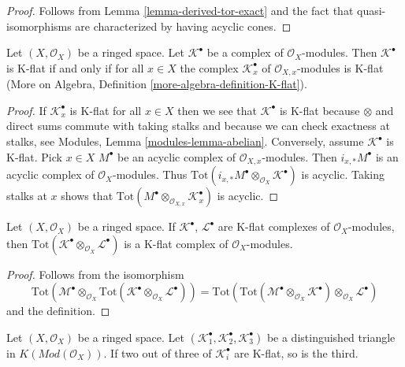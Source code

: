 \begin{proof}
Follows from
Lemma \ref{lemma-derived-tor-exact}
and the fact that quasi-isomorphisms are characterized by having
acyclic cones.
\end{proof}

\begin{lemma}
\label{lemma-check-K-flat-stalks}
Let $(X, \mathcal{O}_X)$ be a ringed space. Let $\mathcal{K}^\bullet$
be a complex of $\mathcal{O}_X$-modules. Then $\mathcal{K}^\bullet$
is K-flat if and only if for all $x \in X$ the complex
$\mathcal{K}_x^\bullet$ of $\mathcal{O}_{X, x}$-modules is K-flat
(More on Algebra, Definition \ref{more-algebra-definition-K-flat}).
\end{lemma}

\begin{proof}
If $\mathcal{K}_x^\bullet$ is K-flat for all $x \in X$ then we see
that $\mathcal{K}^\bullet$ is K-flat because $\otimes$ and
direct sums commute with taking stalks and because we can check exactness
at stalks, see
Modules, Lemma \ref{modules-lemma-abelian}.
Conversely, assume $\mathcal{K}^\bullet$ is K-flat. Pick $x \in X$
$M^\bullet$ be an acyclic complex of $\mathcal{O}_{X, x}$-modules.
Then $i_{x, *}M^\bullet$ is an acyclic complex of $\mathcal{O}_X$-modules.
Thus $\text{Tot}(i_{x, *}M^\bullet \otimes_{\mathcal{O}_X} \mathcal{K}^\bullet)$
is acyclic. Taking stalks at $x$ shows that
$\text{Tot}(M^\bullet \otimes_{\mathcal{O}_{X, x}} \mathcal{K}_x^\bullet)$
is acyclic.
\end{proof}

\begin{lemma}
\label{lemma-tensor-product-K-flat}
Let $(X, \mathcal{O}_X)$ be a ringed space.
If $\mathcal{K}^\bullet$, $\mathcal{L}^\bullet$ are K-flat complexes
of $\mathcal{O}_X$-modules, then
$\text{Tot}(\mathcal{K}^\bullet \otimes_{\mathcal{O}_X} \mathcal{L}^\bullet)$
is a K-flat complex of $\mathcal{O}_X$-modules.
\end{lemma}

\begin{proof}
Follows from the isomorphism
$$
\text{Tot}(\mathcal{M}^\bullet \otimes_{\mathcal{O}_X}
\text{Tot}(\mathcal{K}^\bullet \otimes_{\mathcal{O}_X} \mathcal{L}^\bullet))
=
\text{Tot}(\text{Tot}(\mathcal{M}^\bullet \otimes_{\mathcal{O}_X}
\mathcal{K}^\bullet) \otimes_{\mathcal{O}_X} \mathcal{L}^\bullet)
$$
and the definition.
\end{proof}

\begin{lemma}
\label{lemma-K-flat-two-out-of-three}
Let $(X, \mathcal{O}_X)$ be a ringed space.
Let $(\mathcal{K}_1^\bullet, \mathcal{K}_2^\bullet, \mathcal{K}_3^\bullet)$
be a distinguished triangle in $K(\textit{Mod}(\mathcal{O}_X))$.
If two out of three of $\mathcal{K}_i^\bullet$ are K-flat, so is the third.
\end{lemma}

